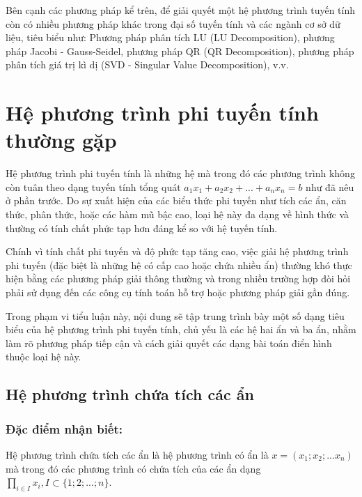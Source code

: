 \documentclass[12pt,a4paper,oneside]{book}
\theoremstyle{theorem}
\theoremstyle{definition}
\begin{document}
Bên cạnh các phương pháp kể trên, để giải quyết một hệ phương trình tuyến tính còn có nhiều phương pháp khác trong đại số tuyến tính và các ngành cơ sở dữ liệu, tiêu biểu như:
 Phương pháp phân tích LU (LU Decomposition), phương pháp Jacobi - Gauss-Seidel, phương pháp QR (QR Decomposition), phương pháp phân tích giá trị kì dị (SVD - Singular Value Decomposition), v.v.  

\section{Hệ phương trình phi tuyến tính thường gặp}
Hệ phương trình phi tuyến tính là những hệ mà trong đó các phương trình không còn tuân theo dạng tuyến tính tổng quát 
$a_1x_1+a_2x_2+...+a_nx_n=b$ như đã nêu ở phần trước. Do sự xuất hiện của các biểu thức phi tuyến như tích các ẩn, căn thức, phân thức, hoặc các hàm mũ bậc cao, loại hệ này đa dạng về hình thức và thường có tính chất phức tạp hơn đáng kể so với hệ tuyến tính.

Chính vì tính chất phi tuyến và độ phức tạp tăng cao, việc giải hệ phương trình phi tuyến (đặc biệt là những hệ có cấp cao hoặc chứa nhiều ẩn) thường khó thực hiện bằng các phương pháp giải thông thường và trong nhiều trường hợp đòi hỏi phải sử dụng đến các công cụ tính toán hỗ trợ hoặc phương pháp giải gần đúng.

Trong phạm vi tiểu luận này, nội dung sẽ tập trung trình bày một số dạng tiêu biểu của hệ phương trình phi tuyến tính, chủ yếu là các hệ hai ẩn và ba ẩn, nhằm làm rõ phương pháp tiếp cận và cách giải quyết các dạng bài toán điển hình thuộc loại hệ này.
\subsection{Hệ phương trình chứa tích các ẩn}
\subsubsection{Đặc điểm nhận biết:} Hệ phương trình chứa tích các ẩn là hệ phương trình có ẩn là $x=(x_1;x_2;...x_n)$ mà trong đó các phương trình có chứa tích của các ẩn dạng $\displaystyle \prod_{i\in I}{x_i}, I \subset \{1;2;...;n\}$.
\end{document}
